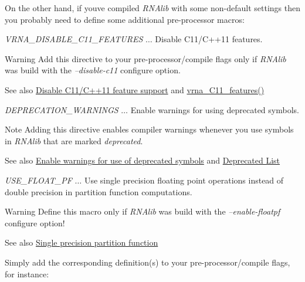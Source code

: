 On the other hand, if you\textquotesingle{}ve compiled {\itshape R\+N\+Alib} with some non-\/default settings then you probably need to define some additional pre-\/processor macros\+:


\begin{DoxyItemize}
\item {\itshape V\+R\+N\+A\+\_\+\+D\+I\+S\+A\+B\+L\+E\+\_\+\+C11\+\_\+\+F\+E\+A\+T\+U\+R\+ES} $\ldots$ Disable C11/\+C++11 features. \begin{DoxyWarning}{Warning}
Add this directive to your pre-\/processor/compile flags only if {\itshape R\+N\+Alib} was build with the {\itshape --disable-\/c11} configure option. 
\end{DoxyWarning}
\begin{DoxySeeAlso}{See also}
\hyperlink{install_config_c11}{Disable C11/\+C++11 feature support} and \hyperlink{group__data__structures_ga21744ae2d6a17309f9327d3547cef0cb}{vrna\+\_\+\+C11\+\_\+features()}
\end{DoxySeeAlso}

\item {\itshape D\+E\+P\+R\+E\+C\+A\+T\+I\+O\+N\+\_\+\+W\+A\+R\+N\+I\+N\+GS} $\ldots$ Enable warnings for using deprecated symbols. \begin{DoxyNote}{Note}
Adding this directive enables compiler warnings whenever you use symbols in {\itshape R\+N\+Alib} that are marked {\itshape deprecated}. 
\end{DoxyNote}
\begin{DoxySeeAlso}{See also}
\hyperlink{install_config_deprecated}{Enable warnings for use of deprecated symbols} and \hyperlink{deprecated}{Deprecated List}
\end{DoxySeeAlso}

\item {\itshape U\+S\+E\+\_\+\+F\+L\+O\+A\+T\+\_\+\+PF} $\ldots$ Use single precision floating point operations instead of double precision in partition function computations. \begin{DoxyWarning}{Warning}
Define this macro only if {\itshape R\+N\+Alib} was build with the {\itshape --enable-\/floatpf} configure option! 
\end{DoxyWarning}
\begin{DoxySeeAlso}{See also}
\hyperlink{install_config_float_pf}{Single precision partition function}
\end{DoxySeeAlso}

\end{DoxyItemize}Simply add the corresponding definition(s) to your pre-\/processor/compile flags, for instance\+:

